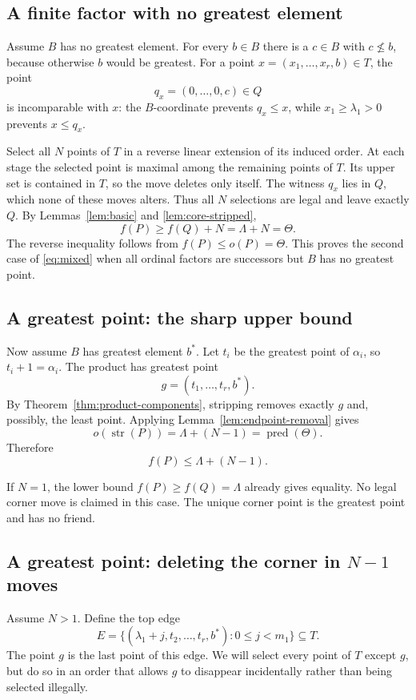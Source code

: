 \documentclass[11pt,letterpaper]{article}
\theoremstyle{definition}
\theoremstyle{remark}
\newcommand{\str}{\operatorname{str}}
\newcommand{\pred}{\operatorname{pred}}
\begin{document}
\subsection{A finite factor with no greatest element}
Assume $B$ has no greatest element. For every $b\in B$ there is a
$c\in B$ with $c\not\le b$, because otherwise $b$ would be greatest.
For a point $x=(x_1,\ldots,x_r,b)\in T$, the point
\[
 q_x=(0,\ldots,0,c)\in Q
\]
is incomparable with $x$: the $B$-coordinate prevents $q_x\le x$, while
$x_1\ge\lambda_1>0$ prevents $x\le q_x$.

Select all $N$ points of $T$ in a reverse linear extension of its induced
order. At each stage the selected point is maximal among the remaining
points of $T$. Its upper set is contained in $T$, so the move deletes
only itself. The witness $q_x$ lies in $Q$, which none of these moves
alters. Thus all $N$ selections are legal and leave exactly $Q$.
By Lemmas~\ref{lem:basic} and \ref{lem:core-stripped},
\[
 f(P)\ge f(Q)+N=\Lambda+N=\Theta.
\]
The reverse inequality follows from $f(P)\le o(P)=\Theta$. This proves
the second case of \eqref{eq:mixed} when all ordinal factors are successors
but $B$ has no greatest point.

\subsection{A greatest point: the sharp upper bound}
Now assume $B$ has greatest element $b^*$. Let $t_i$ be the greatest point
of $\alpha_i$, so $t_i+1=\alpha_i$. The product has greatest point
\[
 g=(t_1,\ldots,t_r,b^*).
\]
By Theorem~\ref{thm:product-components}, stripping removes exactly $g$ and,
possibly, the least point. Applying Lemma~\ref{lem:endpoint-removal} gives
\[
 o(\str(P))=\Lambda+(N-1)=\pred(\Theta).
\]
Therefore
\begin{equation}\label{eq:mixed-top-upper}
 f(P)\le\Lambda+(N-1).
\end{equation}

If $N=1$, the lower bound $f(P)\ge f(Q)=\Lambda$ already gives equality.
No legal corner move is claimed in this case. The unique corner point is
the greatest point and has no friend.

\subsection{A greatest point: deleting the corner in $N-1$ moves}
Assume $N>1$. Define the top edge
\[
 E=\{(\lambda_1+j,t_2,\ldots,t_r,b^*):0\le j<m_1\}\subseteq T.
\]
The point $g$ is the last point of this edge. We will select every point
of $T$ except $g$, but do so in an order that allows $g$ to disappear
incidentally rather than being selected illegally.
\end{document}
